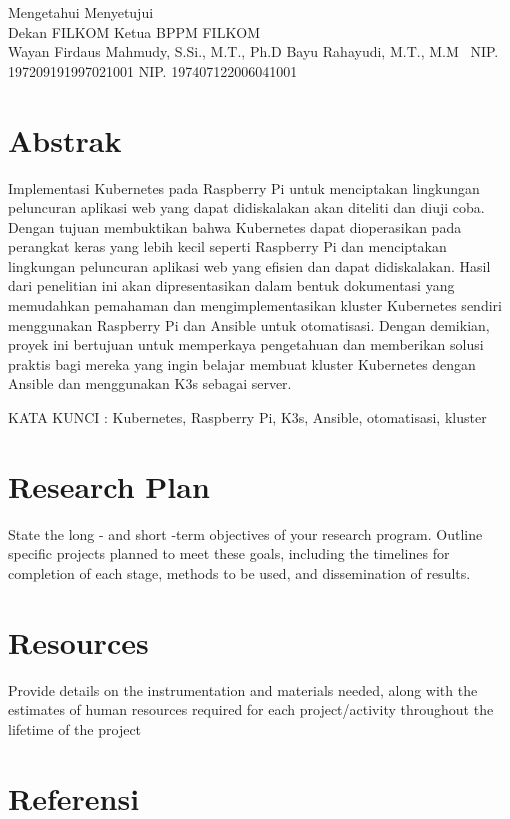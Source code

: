 \documentclass[a4paper,12pt]{article}
\begin{document}
\begin{flushleft}
Mengetahui \hspace{7.7cm} Menyetujui \\
Dekan FILKOM \hspace{6.85cm} Ketua BPPM FILKOM \\
\vspace{1.5cm}
Wayan Firdaus Mahmudy, S.Si., M.T., Ph.D \hspace{1.7cm} Bayu Rahayudi, M.T., M.M \
NIP. 197209191997021001 \hspace{6.05cm} NIP. 197407122006041001    
\end{flushleft}

\section*{Abstrak}
Implementasi Kubernetes pada Raspberry Pi untuk menciptakan lingkungan peluncuran aplikasi web yang dapat didiskalakan akan diteliti dan diuji coba. Dengan tujuan membuktikan bahwa Kubernetes dapat dioperasikan pada perangkat keras yang lebih kecil seperti Raspberry Pi dan menciptakan lingkungan peluncuran aplikasi web yang efisien dan dapat didiskalakan. Hasil dari penelitian ini akan dipresentasikan dalam bentuk dokumentasi yang memudahkan pemahaman dan mengimplementasikan kluster Kubernetes sendiri menggunakan Raspberry Pi dan Ansible untuk otomatisasi. Dengan demikian, proyek ini bertujuan untuk memperkaya pengetahuan dan memberikan solusi praktis bagi mereka yang ingin belajar membuat kluster Kubernetes dengan Ansible dan menggunakan K3s sebagai server.
\addcontentsline{toc}{section}{Abstrak}

\begin{flushleft}
KATA KUNCI : Kubernetes, Raspberry Pi, K3s, Ansible, otomatisasi, kluster 
\end{flushleft}
\newpage

\tableofcontents
\newpage
\listoffigures
\newpage
\listoftables
\newpage

% 
% 




\section{Research Plan}
State the long - and short -term objectives of your research program. Outline specific projects planned to meet these goals, including the timelines for completion of each stage, methods to be used, and dissemination of results. 

\section{Resources}
Provide details on the instrumentation and materials needed, along with the estimates of human resources required for each project/activity throughout the lifetime of the project
\cite{cloud_computing}

\newpage
\section*{Referensi}
\printbibliography[heading=none]
\end{document}
